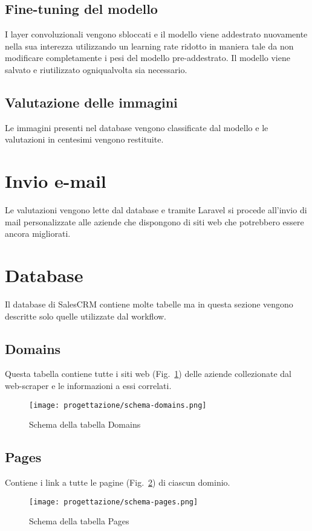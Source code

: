 \subsection{Fine-tuning del modello}
I layer convoluzionali vengono sbloccati e il modello viene addestrato nuovamente nella sua interezza utilizzando un learning rate ridotto in maniera tale da non modificare completamente i pesi del modello pre-addestrato.
Il modello viene salvato e riutilizzato ogniqualvolta sia necessario.

\subsection{Valutazione delle immagini}
Le immagini presenti nel database vengono classificate dal modello e le valutazioni in centesimi vengono restituite.

\section{Invio e-mail}
Le valutazioni vengono lette dal database e tramite Laravel si procede all'invio di mail personalizzate alle aziende che dispongono di siti web che potrebbero essere ancora migliorati.

\section{Database}
Il database di SalesCRM contiene molte tabelle ma in questa sezione vengono descritte solo quelle utilizzate dal workflow.

\subsection{Domains}
Questa tabella contiene tutte i siti web (Fig.~\ref{fig:schema-domains}) delle aziende collezionate dal web-scraper e le informazioni a essi correlati.


\begin{figure}[!h] 
  \centering 
  \texttt{[image: progettazione/schema-domains.png]} 
  \caption{Schema della tabella Domains}
  \label{fig:schema-domains}
\end{figure}


\subsection{Pages}
Contiene i link a tutte le pagine (Fig.~\ref{fig:schema-pages}) di ciascun dominio.

\begin{figure}[!h] 
  \centering 
  \texttt{[image: progettazione/schema-pages.png]} 
  \caption{Schema della tabella Pages}
  \label{fig:schema-pages}
\end{figure}
